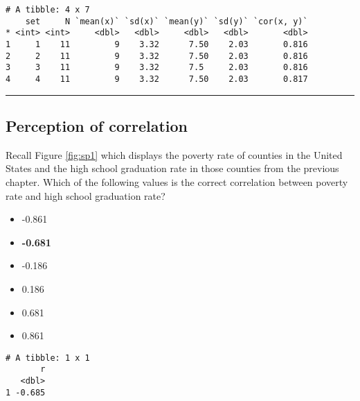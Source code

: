 \documentclass[
]{book}
\newenvironment{Shaded}{\begin{snugshade}}{\end{snugshade}}
\newcommand{\DataTypeTok}[1]{\textcolor[rgb]{0.13,0.29,0.53}{#1}}
\newcommand{\DecValTok}[1]{\textcolor[rgb]{0.00,0.00,0.81}{#1}}
\newcommand{\KeywordTok}[1]{\textcolor[rgb]{0.13,0.29,0.53}{\textbf{#1}}}
\newcommand{\NormalTok}[1]{#1}
\newcommand{\OperatorTok}[1]{\textcolor[rgb]{0.81,0.36,0.00}{\textbf{#1}}}
\newcommand{\StringTok}[1]{\textcolor[rgb]{0.31,0.60,0.02}{#1}}
\providecommand{\tightlist}{%
  \setlength{\itemsep}{0pt}\setlength{\parskip}{0pt}}
\begin{document}
\begin{verbatim}
# A tibble: 4 x 7
    set     N `mean(x)` `sd(x)` `mean(y)` `sd(y)` `cor(x, y)`
* <int> <int>     <dbl>   <dbl>     <dbl>   <dbl>       <dbl>
1     1    11         9    3.32      7.50    2.03       0.816
2     2    11         9    3.32      7.50    2.03       0.816
3     3    11         9    3.32      7.5     2.03       0.816
4     4    11         9    3.32      7.50    2.03       0.817
\end{verbatim}

\begin{center}\rule{0.5\linewidth}{0.5pt}\end{center}

\hypertarget{perception-of-correlation}{%
\subsection*{Perception of correlation}\label{perception-of-correlation}}

Recall Figure \ref{fig:sp1} which displays the poverty rate of counties in the United States and the high school graduation rate in those counties from the previous chapter. Which of the following values is the correct correlation between poverty rate and high school graduation rate?

\begin{itemize}
\tightlist
\item
  -0.861
\item
  \textbf{-0.681}
\item
  -0.186
\item
  0.186
\item
  0.681
\item
  0.861
\end{itemize}

\begin{Shaded}
\end{Shaded}

\begin{verbatim}
# A tibble: 1 x 1
       r
   <dbl>
1 -0.685
\end{verbatim}
\end{document}
